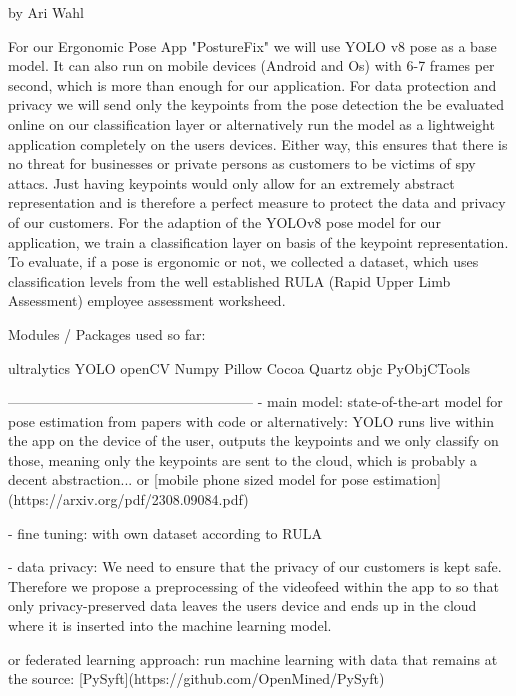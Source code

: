 
by Ari Wahl

For our Ergonomic Pose App "PostureFix" we will use YOLO v8 pose as a base model. It can also run on mobile devices (Android and Os) with 6-7 frames per second\cite{https://github.com/ultralytics/ultralytics/issues/4333}, which is more than enough for our application. For data protection and privacy we will send only the keypoints from the pose detection the be evaluated online on our classification layer or alternatively run the model as a lightweight application completely on the users devices. Either way, this ensures that there is no threat for businesses or private persons as customers to be victims of spy attacs. Just having keypoints would only allow for an extremely abstract representation and is therefore a perfect measure to protect the data and privacy of our customers. For the adaption of the YOLOv8 pose model for our application, we train a classification layer on basis of the keypoint representation. To evaluate, if a pose is ergonomic or not, we collected a dataset, which uses classification levels from the well established RULA (Rapid Upper Limb Assessment) employee assessment worksheed\cite{https://www.researchgate.net/publication/362455275_Home_office_versus_ergonomic_workstation_-_is_the_ergonomic_risk_increased_when_working_at_the_dining_table_An_inertial_motion_capture_based_pilot_study}.


Modules / Packages used so far: 

ultralytics YOLO
openCV
Numpy
Pillow
Cocoa
Quartz
objc
PyObjCTools

-----------------------------------------------------
- main model:
state-of-the-art model for pose estimation from papers with code
or alternatively:
YOLO runs live within the app on the device of the user, outputs the keypoints 
and we only classify on those, meaning only the keypoints are sent to the cloud, 
which is probably a decent abstraction...
or
[mobile phone sized model for pose estimation](https://arxiv.org/pdf/2308.09084.pdf)

- fine tuning:
with own dataset according to RULA

- data privacy:
We need to ensure that the privacy of our customers is kept safe.
Therefore we propose a preprocessing of the videofeed within the app 
to so that only privacy-preserved data leaves the users device 
and ends up in the cloud where it is inserted into the machine learning model.

or federated learning approach:
run machine learning with data that remains at the source:
[PySyft](https://github.com/OpenMined/PySyft)

